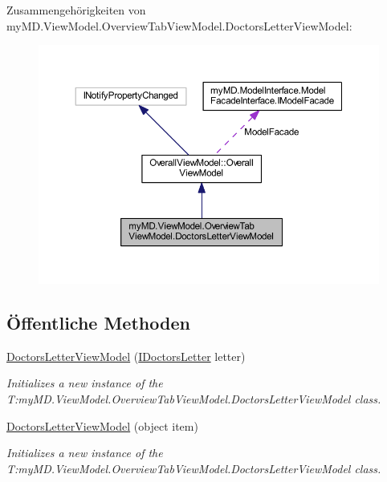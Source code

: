 Zusammengehörigkeiten von my\+M\+D.\+View\+Model.\+Overview\+Tab\+View\+Model.\+Doctors\+Letter\+View\+Model\+:\nopagebreak
\begin{figure}[H]
\begin{center}
\leavevmode
\includegraphics[width=350pt]{classmy_m_d_1_1_view_model_1_1_overview_tab_view_model_1_1_doctors_letter_view_model__coll__graph}
\end{center}
\end{figure}
\subsection*{Öffentliche Methoden}
\begin{DoxyCompactItemize}
\item 
\mbox{\hyperlink{classmy_m_d_1_1_view_model_1_1_overview_tab_view_model_1_1_doctors_letter_view_model_a587e53a436f0a4472d49493bcdc97f9d}{Doctors\+Letter\+View\+Model}} (\mbox{\hyperlink{interfacemy_m_d_1_1_model_interface_1_1_data_model_interface_1_1_i_doctors_letter}{I\+Doctors\+Letter}} letter)
\begin{DoxyCompactList}\small\item\em Initializes a new instance of the T\+:my\+M\+D.\+View\+Model.\+Overview\+Tab\+View\+Model.\+Doctors\+Letter\+View\+Model class. \end{DoxyCompactList}\item 
\mbox{\hyperlink{classmy_m_d_1_1_view_model_1_1_overview_tab_view_model_1_1_doctors_letter_view_model_ac1266020659a2746aa6f94d2bc4efa3e}{Doctors\+Letter\+View\+Model}} (object item)
\begin{DoxyCompactList}\small\item\em Initializes a new instance of the T\+:my\+M\+D.\+View\+Model.\+Overview\+Tab\+View\+Model.\+Doctors\+Letter\+View\+Model class. \end{DoxyCompactList}\end{DoxyCompactItemize}
